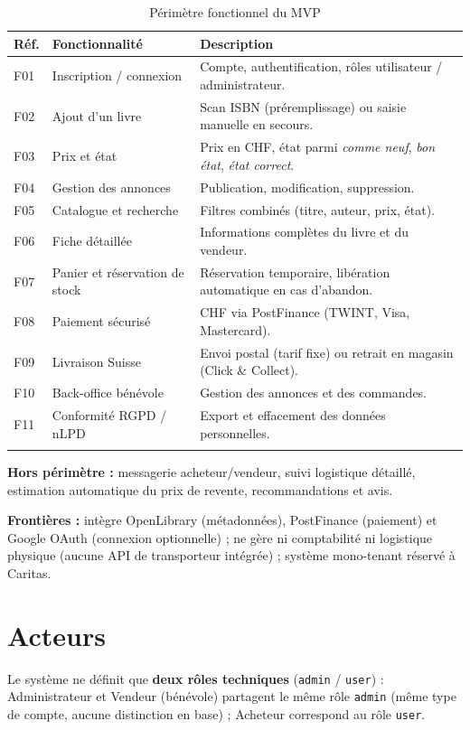 \documentclass[10pt, a4paper]{article}
\begin{document}
\begin{longtable}{@{}L{1.2cm}L{3.5cm}L{9.8cm}@{}}
\toprule
\textbf{Réf.} & \textbf{Fonctionnalité} & \textbf{Description} \\
\midrule
\endhead
F01 & Inscription / connexion & Compte, authentification, rôles utilisateur / administrateur. \\
F02 & Ajout d'un livre & Scan ISBN (préremplissage) ou saisie manuelle en secours. \\
F03 & Prix et état & Prix en CHF, état parmi \textit{comme neuf}, \textit{bon état}, \textit{état correct}. \\
F04 & Gestion des annonces & Publication, modification, suppression. \\
F05 & Catalogue et recherche & Filtres combinés (titre, auteur, prix, état). \\
F06 & Fiche détaillée & Informations complètes du livre et du vendeur. \\
F07 & Panier et réservation de stock & Réservation temporaire, libération automatique en cas d'abandon. \\
F08 & Paiement sécurisé & CHF via PostFinance (TWINT, Visa, Mastercard). \\
F09 & Livraison Suisse & Envoi postal (tarif fixe) ou retrait en magasin (Click \& Collect). \\
F10 & Back-office bénévole & Gestion des annonces et des commandes. \\
F11 & Conformité RGPD / nLPD & Export et effacement des données personnelles. \\
\bottomrule
\caption{Périmètre fonctionnel du MVP}
\end{longtable}

\noindent\textbf{Hors périmètre :} messagerie acheteur/vendeur, suivi logistique détaillé,
estimation automatique du prix de revente, recommandations et avis.

\noindent\textbf{Frontières :} intègre OpenLibrary (métadonnées), PostFinance (paiement) et
Google OAuth (connexion optionnelle) ; ne gère ni comptabilité ni logistique physique
(aucune API de transporteur intégrée) ; système mono-tenant réservé à Caritas.

\section{Acteurs}

\noindent Le système ne définit que \textbf{deux rôles techniques} (\texttt{admin} / \texttt{user}) : Administrateur et Vendeur (bénévole) partagent le même rôle \texttt{admin} (même type de compte, aucune distinction en base) ; Acheteur correspond au rôle \texttt{user}.
\end{document}
